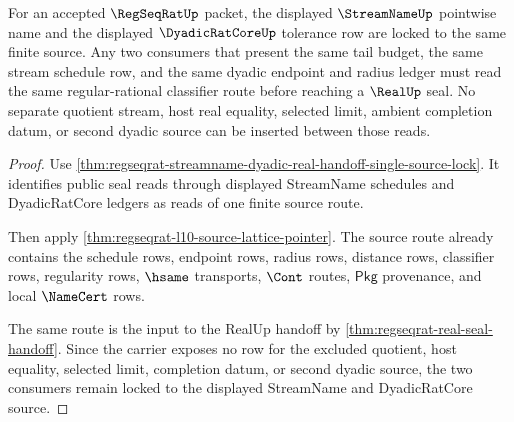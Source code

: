 \begin{theorem}
\label{thm:regseqrat-streamname-dyadic-source-lock}
For an accepted $\RegSeqRatUp$ packet, the displayed $\StreamNameUp$ pointwise
name and the displayed $\DyadicRatCoreUp$ tolerance row are locked to the same
finite source. Any two consumers that present the same tail budget, the same
stream schedule row, and the same dyadic endpoint and radius ledger must read
the same regular-rational classifier route before reaching a $\RealUp$ seal.
No separate quotient stream, host real equality, selected limit, ambient
completion datum, or second dyadic source can be inserted between those reads.
\end{theorem}
\begin{proof}
Use \autoref{thm:regseqrat-streamname-dyadic-real-handoff-single-source-lock}.
It identifies public seal reads through displayed StreamName schedules and
DyadicRatCore ledgers as reads of one finite source route.

Then apply \autoref{thm:regseqrat-l10-source-lattice-pointer}. The source route
already contains the schedule rows, endpoint rows, radius rows, distance rows,
classifier rows, regularity rows, $\hsame$ transports, $\Cont$ routes,
$\mathsf{Pkg}$ provenance, and local $\NameCert$ rows.

The same route is the input to the RealUp handoff by
\autoref{thm:regseqrat-real-seal-handoff}. Since the carrier exposes no row for
the excluded quotient, host equality, selected limit, completion datum, or
second dyadic source, the two consumers remain locked to the displayed
StreamName and DyadicRatCore source.
\end{proof}

